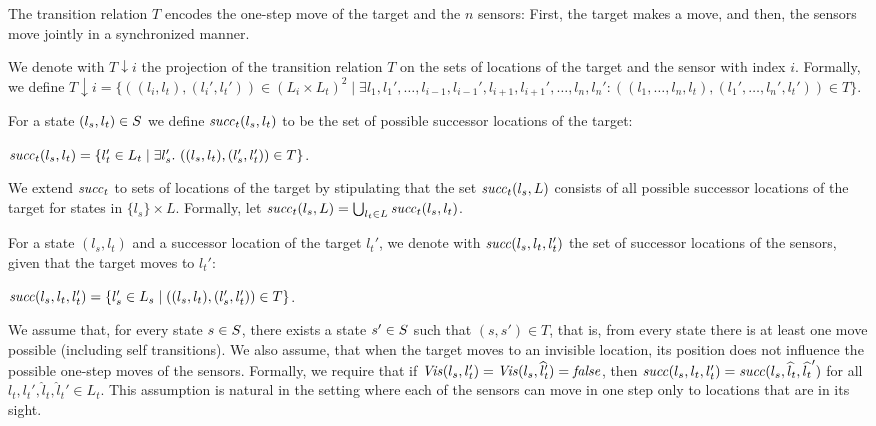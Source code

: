The transition relation $T$ encodes the one-step move of the target and the $n$ sensors: First, the target makes a move, and then, the sensors move jointly in a synchronized manner. 

We denote with $T{\downarrow}i$ the projection of the transition relation $T$ on the sets of locations of the target and the sensor with index $i$. Formally, we define
$T{\downarrow }i = \{((l_i,l_t),(l_i',l_t')) \in (L_i \times L_t)^2 \mid \exists l_1,l_1',\ldots,l_{i-1},l_{i-1}',l_{i+1},l_{i+1}',\ldots,l_n,l_n' : ((l_1,\ldots,l_n,l_t),(l_1',\ldots,l_n',l_t')) \in T\}.$ 

For a state $(l_s,l_t) \in S$ we define $\mathit{succ}_t(l_s,l_t)$ to be the set of possible successor locations of the target:

$\mathit{succ}_t(l_s,l_{t}) = \{l_{t}' \in L_t \mid \exists l_s'.\ ((l_s,l_t),(l_s',l_t')) \in T\}$.

We extend $\mathit{succ}_t$ to sets of locations of the target by stipulating that the set $\mathit{succ}_t(l_s,L)$ consists of all possible successor locations of the target for states in $\{l_s\} \times L$. Formally, let $\mathit{succ}_t(l_s, L) = \bigcup_{l_t \in L}\mathit{succ}_t(l_s,l_t)$.

For a state $(l_s,l_t)$ and a successor location of the target $l_t'$, we denote with $\mathit{succ}(l_s,l_t,l_t')$ the set of successor locations of the sensors, given that the target moves to $l_t'$: 

$\mathit{succ}(l_s,l_t,l_t') = \{l_s' \in L_s \mid  ((l_s,l_t),(l_s',l_t')) \in T\}$.

We assume that, for every state $s\in S$, there exists a state $s' \in S$ such that $(s,s') \in T$, that is, from every state there is at least one move possible (including self transitions). We also assume, that when the target moves to an invisible location, its position does not influence the possible one-step moves of the sensors. Formally, we require that if $\mathit{Vis}(l_s,l_t') = \mathit{Vis}(l_s,{\widehat l_t}')=\mathit{false}$, then $\mathit{succ}(l_s,l_t,l_t') = \mathit{succ}(l_s,{\widehat l_t},\widehat{l_t}')$ for all $l_t,l_t',\widehat l_t,\widehat l_t' \in L_t$. This assumption is natural in the setting where each of the  sensors can move in one step only to locations that are in its sight.

